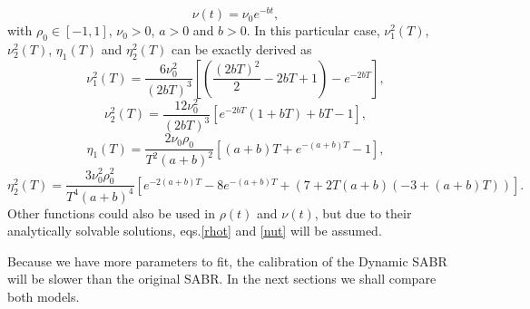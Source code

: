 \begin{equation}\label{nut}
\nu(t)=\nu_0e^{-bt},
\end{equation}
\noindent with $\rho_0\in[-1,1]$, $\nu_0>0$, $a>0$ and $b>0$.
In this particular case, $\nu_1^2(T)$, $\nu_2^2(T)$, $\eta_1(T)$ and $\eta_2^2(T)$ can be exactly derived as
\begin{equation}
\nu_1^2(T)=\frac{6\nu_0^2}{(2bT)^3}\left[\left(\frac{(2bT)^2}{2}-2bT+1\right)-e^{-2bT}\right],
\end{equation}
\begin{equation}
\nu_2^2(T)=\frac{12\nu_0^2}{(2bT)^3}\left[e^{-2bT}(1+bT)+bT-1\right],
\end{equation}
\begin{equation}
\eta_1(T)=\frac{2\nu_0\rho_0}{T^2(a+b)^2}\left[(a+b)T+e^{-(a+b)T}-1\right],
\end{equation}
\begin{equation}
\eta_2^2(T)=\frac{3\nu_0^2\rho_0^2}{T^4(a+b)^4}\left[e^{-2(a+b)T}-8e^{-(a+b)T}+(7+2T(a+b)(-3+(a+b)T))\right].
\end{equation}
\noindent Other functions could also be used in $\rho(t)$ and $\nu(t)$, but due to their analytically solvable solutions, eqs.\eqref{rhot} and \eqref{nut} will be assumed.

Because we have more parameters to fit, the calibration of the Dynamic SABR will be slower than the original SABR. In the next sections we shall compare both models.